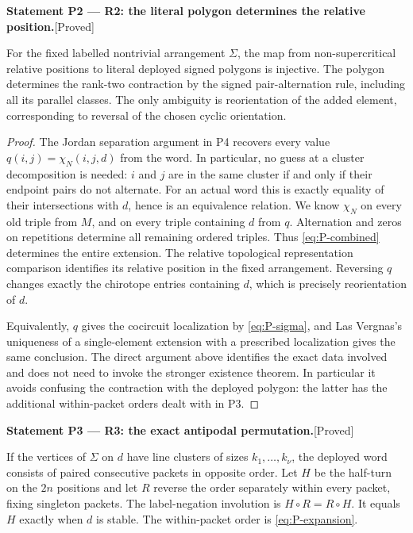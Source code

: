 \documentclass[11pt,a4paper]{article}
\newenvironment{resultenv}[3]{\par\medskip\phantomsection\label{#1}\noindent\textbf{Statement #1 --- #3.}\quad\textsf{[#2]}\par\smallskip\noindent\ignorespaces}{\par\medskip}
\begin{document}
\begin{resultenv}{P2}{Proved}{R2: the literal polygon determines the relative position}
For the fixed labelled nontrivial arrangement $\Sigma$, the map from
non-supercritical relative positions to literal deployed signed
polygons is injective.  The polygon determines the rank-two
contraction by the signed pair-alternation rule, including all its
parallel classes.  The only ambiguity is reorientation of the added
element, corresponding to reversal of the chosen cyclic orientation.
\end{resultenv}

\begin{proof}
The Jordan separation argument in P4 recovers every value
$q(i,j)=\chi_N(i,j,d)$ from the word.  In particular, no guess at a
cluster decomposition is needed: $i$ and $j$ are in the same cluster
if and only if their endpoint pairs do not alternate.  For an actual
word this is exactly equality of their intersections with $d$, hence
is an equivalence relation.  We know $\chi_N$ on every old triple
from $M$, and on every triple containing $d$ from $q$.  Alternation
and zeros on repetitions determine all remaining ordered triples.
Thus \eqref{eq:P-combined} determines the entire extension.  The
relative topological representation comparison identifies its
relative position in the fixed arrangement.  Reversing $q$ changes
exactly the chirotope entries containing $d$, which is precisely
reorientation of $d$.

Equivalently, $q$ gives the cocircuit localization by
\eqref{eq:P-sigma}, and Las Vergnas's uniqueness of a single-element
extension with a prescribed localization gives the same conclusion.
The direct argument above identifies the exact data involved and
does not need to invoke the stronger existence theorem.  In
particular it avoids confusing the contraction with the deployed
polygon: the latter has the additional within-packet orders dealt
with in P3.
\end{proof}

\begin{resultenv}{P3}{Proved}{R3: the exact antipodal permutation}
If the vertices of $\Sigma$ on $d$ have line clusters of sizes
$k_1,\ldots,k_\nu$, the deployed word consists of paired consecutive
packets in opposite order.  Let $H$ be the half-turn on the $2n$
positions and let $R$ reverse the order separately within every
packet, fixing singleton packets.  The label-negation involution is
$H\circ R=R\circ H$.  It equals $H$ exactly when $d$ is stable.
The within-packet order is \eqref{eq:P-expansion}.
\end{resultenv}
\end{document}
